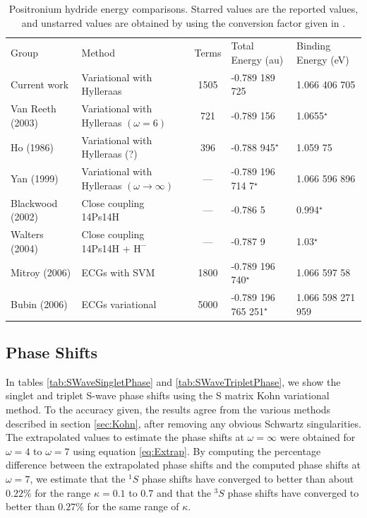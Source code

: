 \documentclass[preprint,showpacs,preprintnumbers,amsmath,amssymb]{revtex4}
\begin{document}
\squeezetable  %
\begin{table}[H]
\begin{center}
\begin{ruledtabular}  %
\begin{tabular}{l l c l l}
Group & Method & Terms & Total Energy (au) & Binding Energy (eV)\\
\colrule
Current work & Variational with Hylleraas & 1505 & -0.789 189 725 & 1.066 406 705 \\
Van Reeth (2003) \cite{VanReeth2003} & Variational with Hylleraas $(\omega = 6)$ & 721 & -0.789 156 & 1.0655$^\star$ \\
Ho (1986) \cite{Ho1986} & Variational with Hylleraas (?) & 396 & -0.788 945$^\star$ & 1.059 75 \\
Yan (1999) \cite{Yan1999} & Variational with Hylleraas $(\omega \rightarrow \infty)$ & --- & -0.789 196 714 7$^\star$ & 1.066 596 896 \\
Blackwood (2002) \cite{Blackwood2002} & Close coupling 14Ps14H & --- & -0.786 5 & 0.994$^\star$ \\
Walters (2004) \cite{Walters2004} & Close coupling 14Ps14H + $\text{H}^-$ & --- & -0.787 9 & 1.03$^\star$\\
Mitroy (2006) \cite{Mitroy2006} & ECGs with SVM & 1800 & -0.789 196 740$^\star$ & 1.066 597 58 \\
Bubin (2006) \cite{Bubin2006} & ECGs variational & 5000 & -0.789 196 765 251$^\star$ & 1.066 598 271 959 \\
\end{tabular}
\end{ruledtabular}
\caption{Positronium hydride energy comparisons. Starred values are the reported values, and unstarred values are obtained by using the conversion factor given in \cite{NISTConversions}.}
\label{tab:BoundEnergy}
\end{center}
\end{table}


\subsection{Phase Shifts}

In tables \ref{tab:SWaveSingletPhase} and \ref{tab:SWaveTripletPhase}, we show the singlet and triplet S-wave phase shifts using the S matrix Kohn variational method. To the accuracy given, the results agree from the various methods described in section \ref{sec:Kohn}, after removing any obvious Schwartz singularities. The extrapolated values to estimate the phase shifts at $\omega = \infty$ were obtained for $\omega = 4$ to $\omega = 7$ using equation \ref{eq:Extrap}. By computing the percentage difference between the extrapolated phase shifts and the computed phase shifts at $\omega=7$, we estimate that the $^1S$ phase shifts have converged to better than about $0.22\%$ for the range $\kappa=0.1$ to $0.7$ and that the $^3S$ phase shifts have converged to better than $0.27\%$ for the same range of $\kappa$.
\end{document}
